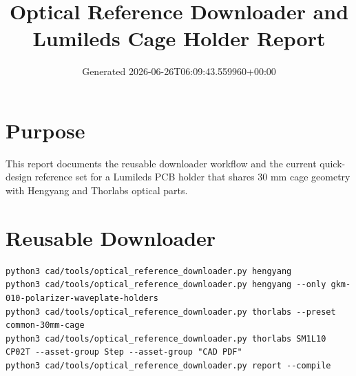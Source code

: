 \documentclass[10pt]{article}
\begin{document}
\title{Optical Reference Downloader and Lumileds Cage Holder Report}
\date{Generated 2026-06-26T06:09:43.559960+00:00}
\maketitle
\section{Purpose}
This report documents the reusable downloader workflow and the current quick-design reference set for a Lumileds PCB holder that shares 30 mm cage geometry with Hengyang and Thorlabs optical parts.
\section{Reusable Downloader}
\begin{verbatim}
python3 cad/tools/optical_reference_downloader.py hengyang
python3 cad/tools/optical_reference_downloader.py hengyang --only gkm-010-polarizer-waveplate-holders
python3 cad/tools/optical_reference_downloader.py thorlabs --preset common-30mm-cage
python3 cad/tools/optical_reference_downloader.py thorlabs SM1L10 CP02T --asset-group Step --asset-group "CAD PDF"
python3 cad/tools/optical_reference_downloader.py report --compile
\end{verbatim}
\end{document}
